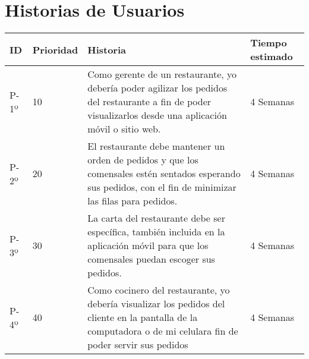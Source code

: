 \chapter{Historias de Usuarios}

\begin{table}[htbp]
	\begin{center}
		\begin{tabular}{| p{1.0cm}| p{2.0cm} | p{7.0cm}| p{4.0cm} |}
			\hline
			
			\textbf{ID} & \textbf {Prioridad} & \textbf{Historia} & \textbf{Tiempo estimado}
			
			\\\hline
			P-1º & 10 &
			
			Como gerente de un restaurante, yo debería poder agilizar los pedidos del restaurante a fin de poder visualizarlos desde una aplicación móvil o sitio web.
			
			& 4 Semanas
			
			\\\hline
			P-2º & 20 & 
			
			El restaurante debe mantener un orden de pedidos y que los comensales estén sentados esperando sus pedidos, con el fin de minimizar las filas para pedidos.
			
			& 4 Semanas
			
			\\\hline
			P-3º & 30	& 
			
			La carta del restaurante debe ser específica, también incluida en la aplicación móvil para que los comensales puedan escoger sus pedidos.
			
			& 4 Semanas
			
			\\\hline
			P-4º & 40	& 
			
			Como cocinero del restaurante, yo debería visualizar los pedidos del cliente en la pantalla de la computadora o de mi celulara fin de poder servir sus pedidos
			
			& 4 Semanas \\\hline
		\end{tabular}
	\end{center}
\end{table}
